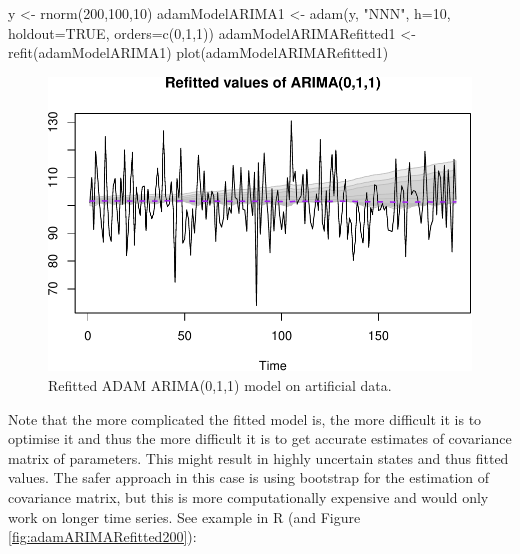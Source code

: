 \documentclass[
]{book}
\newenvironment{Shaded}{\begin{snugshade}}{\end{snugshade}}
\newcommand{\AttributeTok}[1]{\textcolor[rgb]{0.77,0.63,0.00}{#1}}
\newcommand{\ConstantTok}[1]{\textcolor[rgb]{0.00,0.00,0.00}{#1}}
\newcommand{\DecValTok}[1]{\textcolor[rgb]{0.00,0.00,0.81}{#1}}
\newcommand{\FunctionTok}[1]{\textcolor[rgb]{0.00,0.00,0.00}{#1}}
\newcommand{\NormalTok}[1]{#1}
\newcommand{\OtherTok}[1]{\textcolor[rgb]{0.56,0.35,0.01}{#1}}
\newcommand{\StringTok}[1]{\textcolor[rgb]{0.31,0.60,0.02}{#1}}
\theoremstyle{definition}
\theoremstyle{definition}
\theoremstyle{definition}
\theoremstyle{definition}
\theoremstyle{remark}
\begin{document}
\begin{Shaded}
\begin{Highlighting}[]
\NormalTok{y }\OtherTok{\textless{}{-}} \FunctionTok{rnorm}\NormalTok{(}\DecValTok{200}\NormalTok{,}\DecValTok{100}\NormalTok{,}\DecValTok{10}\NormalTok{)}
\NormalTok{adamModelARIMA1 }\OtherTok{\textless{}{-}} \FunctionTok{adam}\NormalTok{(y, }\StringTok{"NNN"}\NormalTok{, }\AttributeTok{h=}\DecValTok{10}\NormalTok{, }\AttributeTok{holdout=}\ConstantTok{TRUE}\NormalTok{,}
                       \AttributeTok{orders=}\FunctionTok{c}\NormalTok{(}\DecValTok{0}\NormalTok{,}\DecValTok{1}\NormalTok{,}\DecValTok{1}\NormalTok{))}
\NormalTok{adamModelARIMARefitted1 }\OtherTok{\textless{}{-}} \FunctionTok{refit}\NormalTok{(adamModelARIMA1)}
\FunctionTok{plot}\NormalTok{(adamModelARIMARefitted1)}
\end{Highlighting}
\end{Shaded}

\begin{figure}
\centering
\includegraphics{adam_files/figure-latex/adamARIMARefitted-1.pdf}
\caption{\label{fig:adamARIMARefitted}Refitted ADAM ARIMA(0,1,1) model on artificial data.}
\end{figure}

Note that the more complicated the fitted model is, the more difficult it is to optimise it and thus the more difficult it is to get accurate estimates of covariance matrix of parameters. This might result in highly uncertain states and thus fitted values. The safer approach in this case is using bootstrap for the estimation of covariance matrix, but this is more computationally expensive and would only work on longer time series. See example in R (and Figure \ref{fig:adamARIMARefitted200}):
\end{document}

